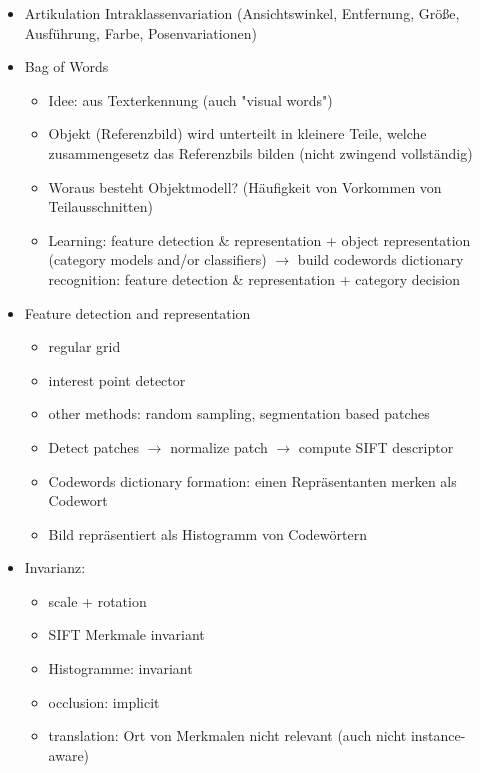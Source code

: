 \documentclass{report}
\begin{document}
\begin{itemize}
		\item Artikulation
		\newline Intraklassenvariation (Ansichtswinkel, Entfernung, Größe, Ausführung, Farbe, Posenvariationen)
		
		\item Bag of Words
		\begin{itemize}
			\item Idee: aus Texterkennung (auch "visual words")
			\item Objekt (Referenzbild) wird unterteilt in kleinere Teile, welche zusammengesetz das Referenzbils bilden (nicht zwingend vollständig)
			\item Woraus besteht Objektmodell? (Häufigkeit von Vorkommen von Teilausschnitten)
			\item Learning: feature detection \& representation + object representation (category models and/or classifiers)
			\newline $\rightarrow$ build codewords dictionary
			\newline recognition: feature detection \& representation + category decision
		\end{itemize}
		
		\item Feature detection and representation
		\begin{itemize}
			\item regular grid
			\item interest point detector
			\item other methods: random sampling, segmentation based patches
			\item Detect patches $\rightarrow$ normalize patch $\rightarrow$ compute SIFT descriptor
			\item Codewords dictionary formation:
			\newline einen Repräsentanten merken als Codewort
			\item Bild repräsentiert als Histogramm von Codewörtern
		\end{itemize}
		
		\item Invarianz:
		\begin{itemize}
			\item scale + rotation
			\item SIFT Merkmale invariant
			\item Histogramme: invariant\newline
			
			\item occlusion: implicit
			\item translation: Ort von Merkmalen nicht relevant (auch nicht instance-aware)
		\end{itemize}
		

\end{itemize}
\end{document}
